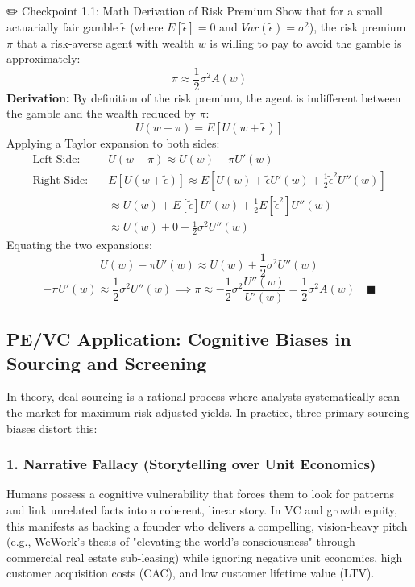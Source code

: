 \documentclass[11pt,a4paper]{article}
\begin{document}
\begin{checkpointbox}{✏️ Checkpoint 1.1: Math Derivation of Risk Premium}
Show that for a small actuarially fair gamble $\tilde{\epsilon}$ (where $E[\tilde{\epsilon}] = 0$ and $Var(\tilde{\epsilon}) = \sigma^2$), the risk premium $\pi$ that a risk-averse agent with wealth $w$ is willing to pay to avoid the gamble is approximately:
\[ \pi \approx \frac{1}{2} \sigma^2 A(w) \]
\textbf{Derivation:}
By definition of the risk premium, the agent is indifferent between the gamble and the wealth reduced by $\pi$:
\[ U(w - \pi) = E[U(w + \tilde{\epsilon})] \]
Applying a Taylor expansion to both sides:
\begin{align*}
    \text{Left Side:} \quad & U(w - \pi) \approx U(w) - \pi U'(w) \\
    \text{Right Side:} \quad & E[U(w + \tilde{\epsilon})] \approx E\left[ U(w) + \tilde{\epsilon}U'(w) + \frac{1}{2}\tilde{\epsilon}^2 U''(w) \right] \\
    & \approx U(w) + E[\tilde{\epsilon}]U'(w) + \frac{1}{2}E[\tilde{\epsilon}^2]U''(w) \\
    & \approx U(w) + 0 + \frac{1}{2}\sigma^2 U''(w)
\end{align*}
Equating the two expansions:
\[ U(w) - \pi U'(w) \approx U(w) + \frac{1}{2}\sigma^2 U''(w) \]
\[ -\pi U'(w) \approx \frac{1}{2}\sigma^2 U''(w) \implies \pi \approx -\frac{1}{2}\sigma^2 \frac{U''(w)}{U'(w)} = \frac{1}{2}\sigma^2 A(w) \quad \blacksquare \]
\end{checkpointbox}

\subsection{PE/VC Application: Cognitive Biases in Sourcing and Screening}
In theory, deal sourcing is a rational process where analysts systematically scan the market for maximum risk-adjusted yields. In practice, three primary sourcing biases distort this:

\subsubsection{1. Narrative Fallacy (Storytelling over Unit Economics)}
Humans possess a cognitive vulnerability that forces them to look for patterns and link unrelated facts into a coherent, linear story. In VC and growth equity, this manifests as backing a founder who delivers a compelling, vision-heavy pitch (e.g., WeWork's thesis of "elevating the world's consciousness" through commercial real estate sub-leasing) while ignoring negative unit economics, high customer acquisition costs (CAC), and low customer lifetime value (LTV).
\end{document}
